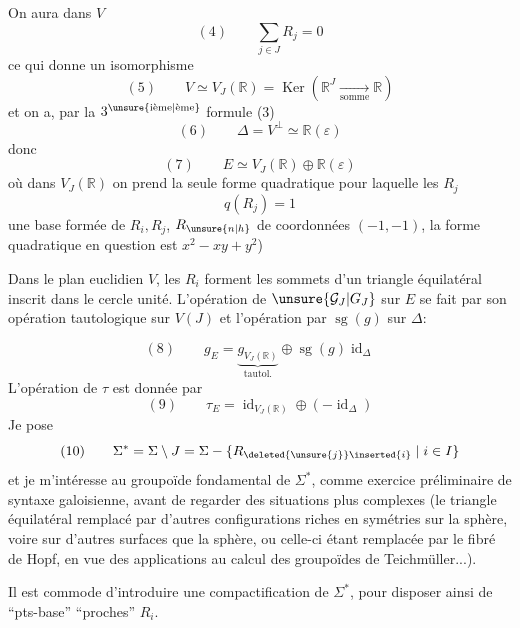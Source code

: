 On aura dans $V$
\[
(4)\qquad\sum_{j\in J}R_j=0
\]
ce qui donne un isomorphisme
\[
(5)\qquad V\simeq V_J(\mathbb R)=\operatorname{Ker}(\mathbb R^J\xrightarrow[\text{somme}]{}\mathbb R)
\]
et on a, par la $3^{\unsure{\text{ième}|\text{ème}}}$ formule (3)
\[
(6)\qquad\Delta=V^\perp\simeq\mathbb R(\varepsilon)
\]
donc
\[
(7)\qquad E\simeq V_J(\mathbb R)\oplus\mathbb R(\varepsilon)
\]
où dans $V_J(\mathbb R)$ on prend la seule forme quadratique  pour laquelle les $R_j$   
\[
q(R_j)=1
\]
 une base formée de $R_i,R_j$, $R_{\unsure{n|h}}$ de coordonnées $(-1,-1)$, la forme quadratique en question est $x^2-xy+y^2$)

Dans le plan euclidien $V$, les $R_i$  forment les sommets d'un triangle équilatéral inscrit dans le cercle unité. L'opération de $\unsure{\mathcal G_J|G_J}$ sur $E$ se fait par son opération  tautologique sur $V(J)$ et l'opération par $\operatorname{sg}(g)$ sur $\Delta$:

\[
(8)\qquad g_E=\underbrace{g_{V_J(\mathbb R)}}_{\text{tautol.}}\oplus\operatorname{sg}(g)\operatorname{id}_\Delta
\]
L'opération de $\tau$ est donnée par
\[
(9)\qquad\tau_E=\operatorname{id}_{V_J(\mathbb R)}\oplus(-\operatorname{id}_\Delta)
\]
Je pose
\[
(10)\qquad\Sigma^*=\Sigma\setminus J=\Sigma-\{R_{\deleted{\unsure{j}}\inserted{i}}\mid i\in I\}
\]
et je m'intéresse au groupoïde fondamental de $\Sigma^*$, comme exercice préliminaire de syntaxe galoisienne, avant de regarder des situations  plus complexes (le triangle équilatéral remplacé par d'autres configurations riches en symétries sur la sphère, voire sur d'autres surfaces que la sphère, ou celle-ci étant remplacée par le fibré de Hopf, en vue des applications au calcul des groupoïdes de Teichmüller...).

Il est commode d'introduire une compactification de $\Sigma^*$, pour disposer ainsi de ``pts-base'' ``proches''  $R_i$.

